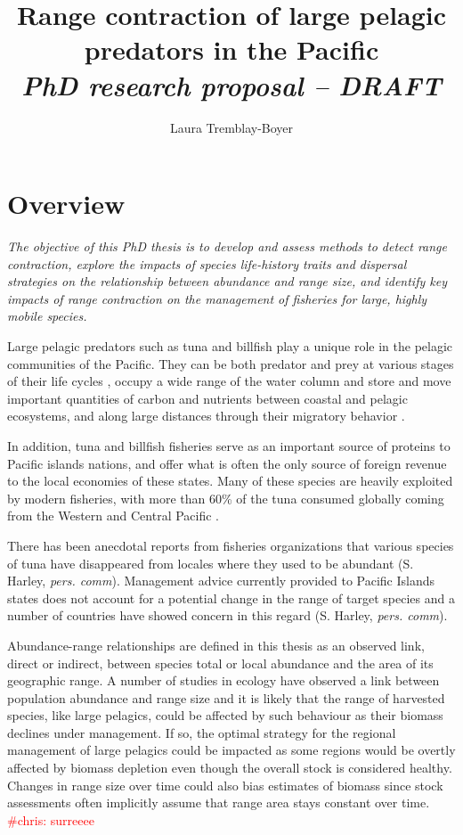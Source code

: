 \documentclass{article}
\title{Range contraction of large pelagic predators in the Pacific \\
  \emph{\large PhD research proposal -- DRAFT}}
\author{Laura Tremblay-Boyer}
\newcommand{\chris}[1]{\textcolor{red}{ \#chris: #1}}
\begin{document}
\maketitle

\section*{Overview}

\emph{The objective of this PhD thesis is to develop and assess methods to detect
range contraction, explore the impacts of species life-history traits
and dispersal strategies on the relationship between abundance and
range size, and identify key impacts of range contraction on the
 management of fisheries for large, highly mobile species.}

Large pelagic predators such as tuna and billfish play a unique role
in the pelagic communities of the Pacific. They can be both predator
and prey at various stages of their life cycles \citep{Young2010_a,
  Cox2002_a, Hinke2004_a}, occupy a wide range of the water column
\citep{Schaefer2009_a} and store and move important quantities of
carbon and nutrients between coastal and pelagic ecosystems, and along
large distances through their migratory behavior
\citep{Allain2012_a}.

In addition, tuna and billfish fisheries serve as an important source
of proteins to Pacific islands nations, and offer what is often the
only source of foreign revenue to the local economies of these
states. Many of these species are heavily exploited by modern
fisheries, with more than 60\% of the tuna consumed globally
coming from the Western and Central Pacific \citep{Williams2012_a}.

There has been anecdotal reports from fisheries organizations that
various species of tuna have disappeared from locales where they used
to be abundant (S. Harley, \emph{pers. comm}). Management advice
currently provided to Pacific Islands states does not account for a
potential change in the range of target species and a number of
countries have showed concern in this regard (S. Harley,
\emph{pers. comm}).

Abundance-range relationships are defined in this thesis as an
observed link, direct or indirect, between species total or local
abundance and the area of its geographic range. A number of
studies in ecology have observed a link between population abundance
and range size \citep{Gaston2000_a, MacCall1990_a, Lawton1993_a} and
it is likely that the range of harvested species, like large
pelagics, could be affected by such behaviour as their biomass
declines under management. If so, the
optimal strategy for the regional management of large pelagics could
be impacted as some regions would be overtly affected by biomass depletion
even though the overall stock is considered healthy. Changes in range
size over time could also bias estimates of biomass since stock
assessments often implicitly assume that range area stays constant over
time.\chris{surreeee}
\end{document}
